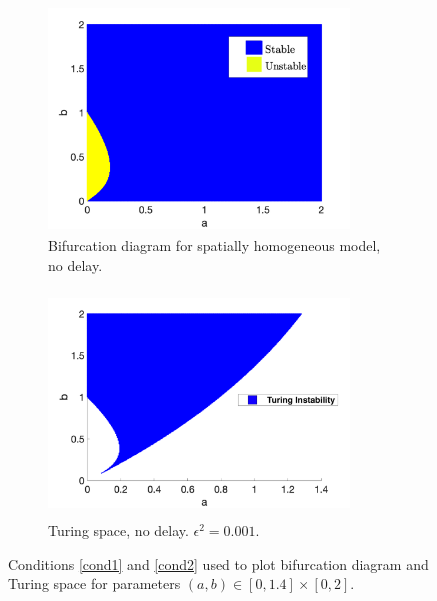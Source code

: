 \begin{figure}[H]
    \centering
    \begin{subfigure}[b]{0.45\textwidth}
        \centering
        \includegraphics[width=8cm,height = 6cm]{bifsh.png}
        \caption{Bifurcation diagram for spatially homogeneous model, no delay.}
        \label{fig:bifsh}
    \end{subfigure}
    \hfill
    \begin{subfigure}[b]{0.45\textwidth}
        \centering
        \includegraphics[width=8cm,height = 6cm]{turingspace.png}
        \caption{Turing space, no delay. $\epsilon^2=0.001$.}
        \label{fig:turingspace}
    \end{subfigure}
    \caption{Conditions \eqref{cond1} and \eqref{cond2} used to plot bifurcation diagram and Turing space for parameters $(a,b)\in[0,1.4]\times[0,2]$.}
    \label{fig:dispfixed}
\end{figure}


